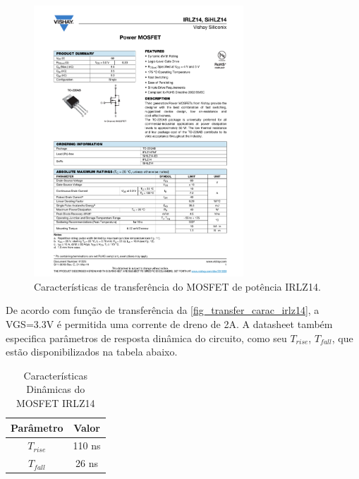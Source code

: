 		\begin{figure}[htb]
			\caption{\label{fig_transfer_carac_irlz14} Características de transferência do MOSFET de potência IRLZ14.}
			\centering		%
			\includegraphics[page=3, width=0.7\textwidth, trim={12cm 16.5cm 2.2cm 5cm}, clip]{circuits/irlz14.pdf}
		\end{figure}
	
		De acordo com função de transferência da \autoref{fig_transfer_carac_irlz14}, a VGS=3.3V é permitida uma corrente de dreno de 2A. A datasheet também especifica parâmetros de resposta dinâmica do circuito, como seu $T_{rise}$, $T_{fall}$, que estão disponibilizados na tabela abaixo.
		
		\begin{table}[ht]
			\caption{Características Dinâmicas do MOSFET IRLZ14}
			\centering
			\begin{tabular}{c c}
				\hline
				Parâmetro  & Valor  \\ \hline
				$T_{rise}$ & 110 ns \\
				$T_{fall}$ & 26 ns  \\ \hline
			\end{tabular}
			\label{tab_irlz14_timing}
		\end{table}
	
